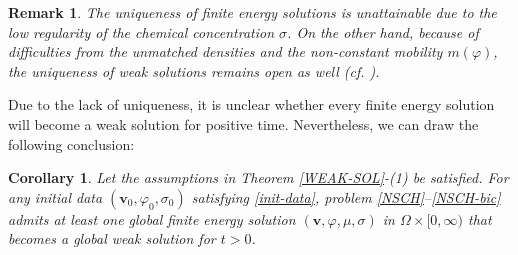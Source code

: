 \documentclass[11pt,reqno]{amsart}
\newtheorem{corollary}{\textbf{Corollary}}[section]
\newtheorem{remark}{\textbf{Remark}}[section]
\def\d{{\rm d}}
\def\vv{\bm{v}}
\begin{document}

\begin{remark}\rm
The uniqueness of finite energy solutions is unattainable due to the low regularity of the chemical concentration $\sigma$. On the other hand, because of difficulties from the unmatched densities and the non-constant mobility $m(\varphi)$, the uniqueness of weak solutions remains open as well (cf. \cite{AGG2023,CGGG,H}).
\end{remark}

Due to the lack of uniqueness, it is unclear whether every finite energy solution will become a weak solution for positive time. Nevertheless, we can draw the following conclusion:
%
\begin{corollary}
\label{finite-to-weak}
Let the assumptions in Theorem \ref{WEAK-SOL}-(1) be satisfied. For any initial data $(\bm{v}_0,\varphi_0,\sigma_0)$ satisfying
\eqref{init-data}, problem \eqref{NSCH}--\eqref{NSCH-bic} admits at least one global finite energy solution $(\vv,\varphi,\mu,\sigma)$ in $\Omega\times [0,\infty)$ that becomes a global weak solution for $t>0$.
\end{corollary}
\end{document}

